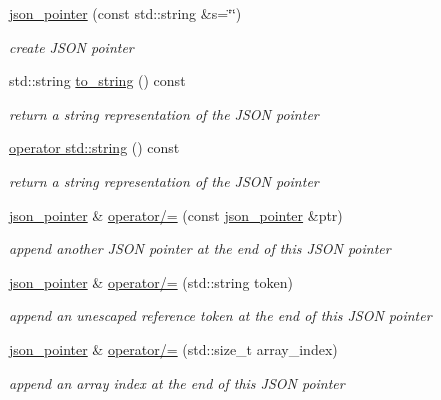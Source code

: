 \begin{DoxyCompactItemize}
\item 
\hyperlink{classnlohmann_1_1json__pointer_a7f32d7c62841f0c4a6784cf741a6e4f8}{json\+\_\+pointer} (const std\+::string \&s=\char`\"{}\char`\"{})
\begin{DoxyCompactList}\small\item\em create J\+S\+ON pointer \end{DoxyCompactList}\item 
std\+::string \hyperlink{classnlohmann_1_1json__pointer_a3d4b15d32d096e3776c5d2c773b524f5}{to\+\_\+string} () const
\begin{DoxyCompactList}\small\item\em return a string representation of the J\+S\+ON pointer \end{DoxyCompactList}\item 
\hyperlink{classnlohmann_1_1json__pointer_ae9015c658f99cf3d48a8563accc79988}{operator std\+::string} () const
\begin{DoxyCompactList}\small\item\em return a string representation of the J\+S\+ON pointer \end{DoxyCompactList}\item 
\hyperlink{classnlohmann_1_1json__pointer}{json\+\_\+pointer} \& \hyperlink{classnlohmann_1_1json__pointer_a7395bd0af29ac23fd3f21543c935cdfa}{operator/=} (const \hyperlink{classnlohmann_1_1json__pointer}{json\+\_\+pointer} \&ptr)
\begin{DoxyCompactList}\small\item\em append another J\+S\+ON pointer at the end of this J\+S\+ON pointer \end{DoxyCompactList}\item 
\hyperlink{classnlohmann_1_1json__pointer}{json\+\_\+pointer} \& \hyperlink{classnlohmann_1_1json__pointer_abdd21567b2b1d69329af0f520335e68b}{operator/=} (std\+::string token)
\begin{DoxyCompactList}\small\item\em append an unescaped reference token at the end of this J\+S\+ON pointer \end{DoxyCompactList}\item 
\hyperlink{classnlohmann_1_1json__pointer}{json\+\_\+pointer} \& \hyperlink{classnlohmann_1_1json__pointer_a64c8401529131bad1e486d91d703795f}{operator/=} (std\+::size\+\_\+t array\+\_\+index)
\begin{DoxyCompactList}\small\item\em append an array index at the end of this J\+S\+ON pointer \end{DoxyCompactList}\item 

\end{DoxyCompactItemize}
